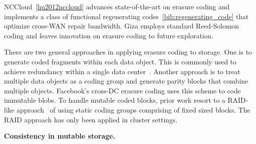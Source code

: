 NCCloud~\ref{hu2012nccloud} advances state-of-the-art on erasure coding and implements a class of functional regenerating codes~\ref{bib:regenerating_code} that optimize cross-WAN repair bandwidth. Giza employs standard Reed-Solomon coding and leaves innovation on erasure coding to future exploration. 

There are two general approaches in applying erasure coding to storage.  One
is to generate coded fragments within each data object.  This is commonly used
to achieve redundancy within a single data center~\cite{facebook:f4}.  Another 
approach is to treat multiple data objects as a coding group and generate
parity blocks that combine multiple objects.  Facebook's cross-DC erasure
coding uses this scheme to code immutable blobs.  To handle mutable coded
blocks, prior work resort to a RAID-like approach~\cite{haibo:fast} of using
static coding groups comprising of fixed sized blocks. The RAID approach has
only been applied in cluster settings.


{\bf Consistency in mutable storage.}

